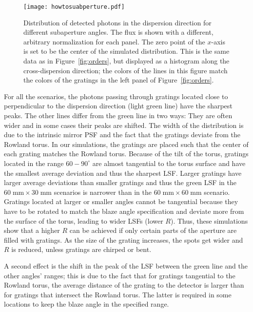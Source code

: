 \documentclass[12pt]{spieman}  %
\begin{document}
\begin{spacing}{1}
\begin{figure} [ht]
  \begin{center}
  \texttt{[image: howtosuabperture.pdf]}
  \end{center}
  \caption {\label{fig:howtosubaperture}
    Distribution of detected photons in the dispersion direction for different subaperture angles. The flux is shown with a different, arbitrary normalization for each panel. The zero point of the $x$-axis is set to be the center of the simulated distribution. This is the same data as in Figure~\ref{fig:orders}, but displayed as a histogram along the cross-dispersion direction; the colors of the lines in this figure match the colors of the gratings in the left panel of Figure~\ref{fig:orders}.
  }
\end{figure}

For all the scenarios, the photons passing through gratings located close to perpendicular to the dispersion direction (light green line) have the sharpest peaks. The other lines differ from the green line in two ways: They are often wider and in some cases their peaks are shifted. The width of the distribution is due to the intrinsic mirror PSF and the fact that the gratings deviate from the Rowland torus. In our simulations, the gratings are placed such that the center of each grating matches the Rowland torus. Because of the tilt of the torus, gratings located in the range $60-90^\circ$ are almost tangential to the torus surface and have the smallest average deviation and thus the sharpest LSF. Larger gratings have larger average deviations than smaller gratings and thus the green LSF in the $60\;\mathrm{mm}\times 30\;\mathrm{mm}$ scenarios is narrower than in the $60\;\mathrm{mm}\times 60\;\mathrm{mm}$ scenario. Gratings located at larger or smaller angles cannot be tangential because they have to be rotated to match the blaze angle specification and deviate more from the surface of the torus, leading to wider LSFs (lower $R$). Thus, these simulations show that a higher $R$ can be achieved if only certain parts of the aperture are filled with gratings. As the size of the grating increases, the spots get wider and $R$ is reduced, unless gratings are chirped or bent.

A second effect is the shift in the peak of the LSF between the green line and the other angles' ranges; this is due to the fact that for gratings tangential to the Rowland torus, the average distance of the grating to the detector is larger than for gratings that intersect the Rowland torus. The latter is required in some locations to keep the blaze angle in the specified range.



\end{spacing}
\end{document}
